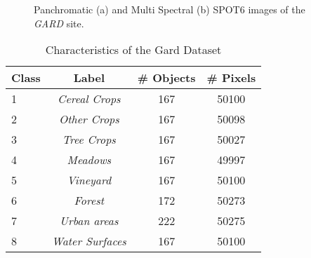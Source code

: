 \documentclass[journal]{IEEEtran}
\begin{document}

\begin{figure}[!ht]
\centering
{}
\caption{ Panchromatic (a) and Multi Spectral (b) SPOT6 images of the \textit{GARD} site. \label{fig:Gard_PAN_XS} }
\end{figure}\begin{table}[!ht]
\centering
\begin{tabular}{|l||c|c|c|}
	\hline
\textbf{Class} & Label & \# \textbf{Objects} & \# \textbf{Pixels} \\
\hline \hline
1 & {\em Cereal Crops} & 167 & 50100 \\ \hline
2 & {\em Other Crops} & 167 & 50098  \\ \hline
3 & {\em Tree Crops} & 167 & 50027 \\ \hline
4 & {\em Meadows} & 167 & 49997 \\ \hline
5 & {\em Vineyard} & 167 & 50100 \\ \hline
6 & {\em Forest} & 172 & 50273 \\ \hline
7 & {\em Urban areas} & 222 & 50275 \\ \hline
8 & {\em Water Surfaces} & 167 & 50100 \\ \hline
\end{tabular}
\caption{Characteristics of the Gard Dataset\label{tab:data_gard}}
\end{table}
\end{document}
